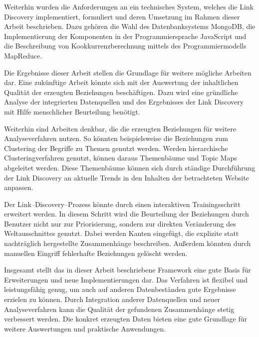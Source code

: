 Weiterhin wurden die Anforderungen an ein technisches System, welches die Link Discovery implementiert, formuliert und deren Umsetzung im Rahmen dieser Arbeit beschrieben. Dazu gehören die Wahl des Datenbanksystems MongoDB, die Implementierung der Komponenten in der Programmiersprache JavaScript und die Beschreibung von Kookkurrenzberechnung mittels des Programmiermodells MapReduce.

Die Ergebnisse dieser Arbeit stellen die Grundlage für weitere mögliche Arbeiten dar. Eine zukünftige Arbeit könnte sich mit der Auswertung der inhaltlichen Qualität der erzeugten Beziehungen beschäftigen. Dazu wird eine gründliche Analyse der integrierten Datenquellen und des Ergebnisses der Link Discovery mit Hilfe menschlicher Beurteilung benötigt.

Weiterhin sind Arbeiten denkbar, die die erzeugten Beziehungen für weitere Analyseverfahren nutzen. So könnten beispielsweise die Beziehungen zum Clustering der Begriffe zu Themen genutzt werden. Werden hierarchische Clusteringverfahren genutzt, können daraus Themenbäume und Topic Maps abgeleitet werden. Diese Themenbäume können sich durch ständige Durchführung der Link Discovery an aktuelle Trends in den Inhalten der betrachteten Website anpassen.

Der Link--Discovery--Prozess könnte durch einen interaktiven Trainingsschritt erweitert werden. In diesem Schritt wird die Beurteilung der Beziehungen durch Benutzer nicht nur zur Priorisierung, sondern zur direkten Veränderung des Weltausschnittes genutzt. Dabei werden Kanten eingefügt, die explizite statt nachträglich hergestellte Zusammenhänge beschreiben. Außerdem könnten durch manuellen Eingriff fehlerhafte Beziehungen gelöscht werden.

Insgesamt stellt das in dieser Arbeit beschriebene Framework eine gute Basis für Erweiterungen und neue Implementierungen dar. Das Verfahren ist flexibel und leistungsfähig genug, um auch auf anderen Datenbeständen gute Ergebnisse erzielen zu können. Durch Integration anderer Datenquellen und neuer Analyseverfahren kann die Qualität der gefundenen Zusammenhänge stetig verbessert werden. Die konkret erzeugten Daten bieten eine gute Grundlage für weitere Auswertungen und praktische Anwendungen.